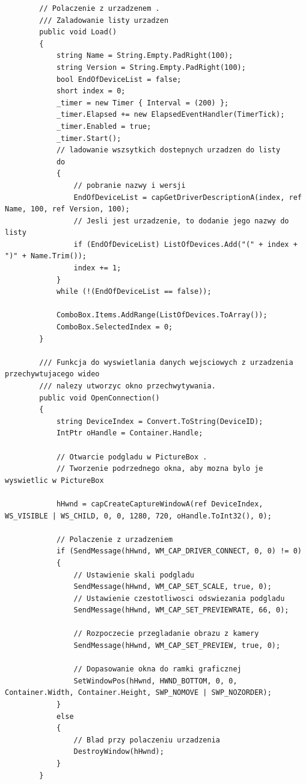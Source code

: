\documentclass[12pt,a4paper,notitlepage]{report}
\begin{document}
\begin{adjustwidth}{0pt}{-50pt}
\begin{lstlisting}
        // Polaczenie z urzadzenem .
        /// Zaladowanie listy urzadzen
        public void Load()
        {
            string Name = String.Empty.PadRight(100);
            string Version = String.Empty.PadRight(100);
            bool EndOfDeviceList = false;
            short index = 0;
            _timer = new Timer { Interval = (200) };
            _timer.Elapsed += new ElapsedEventHandler(TimerTick);
            _timer.Enabled = true;
            _timer.Start();
            // ladowanie wszsytkich dostepnych urzadzen do listy
            do
            {
                // pobranie nazwy i wersji
                EndOfDeviceList = capGetDriverDescriptionA(index, ref Name, 100, ref Version, 100);
                // Jesli jest urzadzenie, to dodanie jego nazwy do listy
                if (EndOfDeviceList) ListOfDevices.Add("(" + index + ")" + Name.Trim());
                index += 1;
            }
            while (!(EndOfDeviceList == false));

            ComboBox.Items.AddRange(ListOfDevices.ToArray());
            ComboBox.SelectedIndex = 0;
        }

        /// Funkcja do wyswietlania danych wejsciowych z urzadzenia przechywtujacego wideo
        /// nalezy utworzyc okno przechwytywania.
        public void OpenConnection()
        {
            string DeviceIndex = Convert.ToString(DeviceID);
            IntPtr oHandle = Container.Handle;

            // Otwarcie podgladu w PictureBox .
            // Tworzenie podrzednego okna, aby mozna bylo je wyswietlic w PictureBox

            hHwnd = capCreateCaptureWindowA(ref DeviceIndex, WS_VISIBLE | WS_CHILD, 0, 0, 1280, 720, oHandle.ToInt32(), 0);

            // Polaczenie z urzadzeniem
            if (SendMessage(hHwnd, WM_CAP_DRIVER_CONNECT, 0, 0) != 0)
            {
                // Ustawienie skali podgladu
                SendMessage(hHwnd, WM_CAP_SET_SCALE, true, 0);
                // Ustawienie czestotliwosci odswiezania podgladu
                SendMessage(hHwnd, WM_CAP_SET_PREVIEWRATE, 66, 0);

                // Rozpoczecie przegladanie obrazu z kamery
                SendMessage(hHwnd, WM_CAP_SET_PREVIEW, true, 0);

                // Dopasowanie okna do ramki graficznej
                SetWindowPos(hHwnd, HWND_BOTTOM, 0, 0, Container.Width, Container.Height, SWP_NOMOVE | SWP_NOZORDER);
            }
            else
            {
                // Blad przy polaczeniu urzadzenia
                DestroyWindow(hHwnd);
            }
        }


\end{lstlisting}
\end{adjustwidth}
\end{document}
